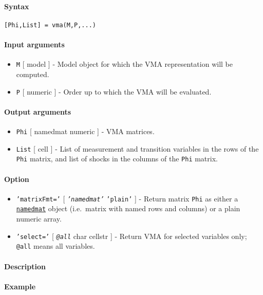 


	\paragraph{Syntax}

\begin{verbatim}
[Phi,List] = vma(M,P,...)
\end{verbatim}

\paragraph{Input arguments}

\begin{itemize}
\item
  \texttt{M} {[} model {]} - Model object for which the VMA
  representation will be computed.
\item
  \texttt{P} {[} numeric {]} - Order up to which the VMA will be
  evaluated.
\end{itemize}

\paragraph{Output arguments}

\begin{itemize}
\item
  \texttt{Phi} {[} namedmat \textbar{} numeric {]} - VMA matrices.
\item
  \texttt{List} {[} cell {]} - List of measurement and transition
  variables in the rows of the \texttt{Phi} matrix, and list of shocks
  in the columns of the \texttt{Phi} matrix.
\end{itemize}

\paragraph{Option}

\begin{itemize}
\item
  \texttt{'matrixFmt='} {[} \emph{\texttt{'namedmat'}} \textbar{}
  \texttt{'plain'} {]} - Return matrix \texttt{Phi} as either a
  \href{namedmat/Contents}{\texttt{namedmat}} object (i.e.~matrix with
  named rows and columns) or a plain numeric array.
\item
  \texttt{'select='} {[} \emph{\texttt{@all}} \textbar{} char \textbar{}
  cellstr {]} - Return VMA for selected variables only; \texttt{@all}
  means all variables.
\end{itemize}

\paragraph{Description}

\paragraph{Example}


